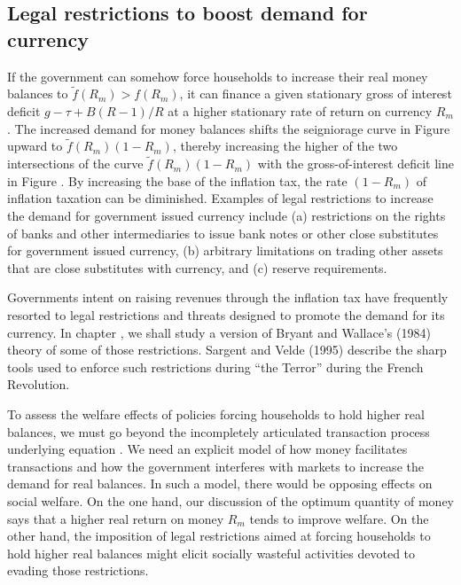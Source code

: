 \subsection{Legal restrictions to boost demand for currency}
If the government can somehow force households to increase their
real money balances to $\tilde f(R_m)>f(R_m)$, it can finance a
given stationary gross
of interest deficit $g - \tau + B(R-1)/R$ at a higher stationary
rate of return on currency $R_m$.  The increased demand for money
balances shifts the seigniorage curve in Figure  %
upward to
$\tilde f(R_m)(1-R_m)$, thereby increasing  the higher of the
two intersections of the curve $\tilde f(R_m)(1-R_m)$ with the
gross-of-interest deficit line in Figure . %
  By increasing the
base of the inflation tax, the rate $(1-R_m)$ of inflation
taxation can be diminished.
Examples of legal restrictions to increase the demand for government
issued currency include (a) restrictions on the rights of banks and
other intermediaries to issue bank notes or other close substitutes
for government issued currency,
(b) arbitrary limitations on trading other assets that are close substitutes with
currency, and (c) reserve requirements.


   Governments intent on raising revenues through the inflation
tax have frequently resorted to legal restrictions and threats
designed to promote the demand for its currency.  In chapter
, we shall study a version of Bryant and Wallace's
(1984) theory of some of those restrictions.  Sargent and Velde
(1995) describe  the sharp tools used to enforce such restrictions during ``the Terror'' during the French
Revolution.
    


To assess the welfare effects of policies forcing households to hold higher
real balances, we must go beyond the incompletely articulated
transaction process underlying equation .
We need an explicit model of how money facilitates transactions and
how the government interferes with markets to increase the demand for
real balances.  In such a model, there would be opposing effects on
social welfare. On the one hand, our discussion of the optimum quantity
of money says that a higher real return on money $R_m$ tends to improve
welfare. On the other hand, the imposition of legal restrictions aimed
at forcing households to hold higher real balances might elicit socially
wasteful activities devoted to evading those
restrictions.
  
